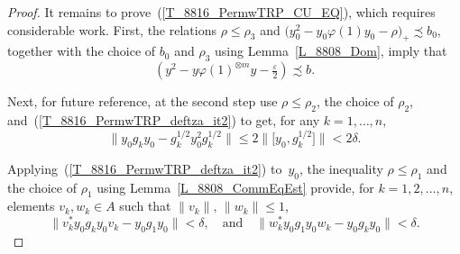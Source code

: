 \documentclass[11pt]{amsart}
\theoremstyle{plain}
\theoremstyle{definition}
\theoremstyle{remark}
\numberwithin{equation}{section}
\newcommand{\dt}{\delta}
\newcommand{\ep}{\varepsilon}
\newcommand{\ph}{\varphi}
\newcommand{\rh}{\rho}
\begin{document}
\begin{proof}
It remains to prove~(\ref{T_8816_PermwTRP_CU_EQ}),
which requires considerable work.
First,
the relations $\rh \leq \rh_3$
and
$\bigl( y_0^{2} - y_0 \varphi (1) y_0 - \rh \bigr)_{+}
 \precsim b_0$,
together with the choice of $b_0$ and $\rh_3$
using Lemma~\ref{L_8808_Dom},
imply that
%
\begin{equation}\label{Eq_8816_yytm}
\left( y^2 - y \ph (1)^{\otimes m} y - \tfrac{\ep}{2} \right)
  \precsim b.
\end{equation}
%

Next, for future reference,
at the second step use $\rh \leq \rh_2$,
the choice of $\rh_2$,
and~(\ref{T_8816_PermwTRP_deftza_it2}) to get, for any $k=1,\ldots,n$,
%
\begin{equation}\label{Eq_8825_FEst}
\bigl\| y_0 g_k y_0 - g_k^{1/2} y_0^2 g_k^{1/2} \bigr\|
 \leq 2 \bigl\| \bigl[ y_0, g_k^{1/2} \bigr] \bigr\|
 < 2 \dt.
\end{equation}
%

Applying~(\ref{T_8816_PermwTRP_deftza_it2}) to~$y_0$,
the inequality $\rh \leq \rh_1$
and the choice of $\rh_1$ using Lemma~\ref{L_8808_CommEqEst}
provide, for $k = 1, 2, \ldots, n$,
elements $v_k, w_k \in A$ such that
$\| v_k \|, \, \| w_k \| \leq 1$,
%
\begin{equation}\label{Eq_8817_vkwk}
\bigl\| v_k^* y_0 g_k y_0 v_k - y_0 g_1 y_0 \bigr\| < \dt,
\quad {\mbox{and}} \quad
\bigl\| w_k^* y_0 g_1 y_0 w_k - y_0 g_k y_0 \bigr\| < \dt.
\end{equation}
%


\end{proof}
\end{document}
